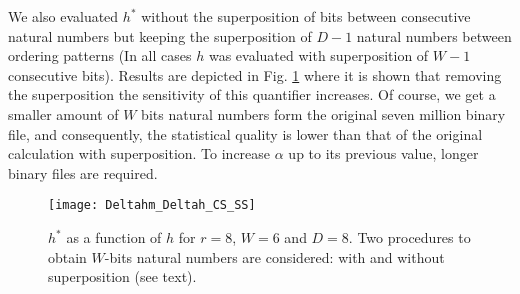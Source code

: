 We also evaluated $h^*$ without the superposition of bits between consecutive natural numbers but keeping the superposition of $D-1$ natural numbers between ordering patterns (In all cases $h$ was evaluated with superposition of $W-1$ consecutive bits). Results are depicted in Fig. \ref{fig:Deltahm_Deltah_CS_SS} where it is shown that removing the superposition the sensitivity of this quantifier increases. Of course, we get a smaller amount of $W$ bits natural numbers form the original seven million binary file, and consequently, the statistical quality is lower than that of the original calculation with superposition. To increase $\alpha$ up to its previous value, longer binary files are required.

\begin{figure}
\center
\texttt{[image: Deltahm\_Deltah\_CS\_SS]}
\caption{$h^*$ as a function of $h$ for $r=8$, $W=6$ and $D=8$. Two procedures to obtain $W$-bits natural numbers are considered: with and without superposition (see text).}
\label{fig:Deltahm_Deltah_CS_SS}
\end{figure}